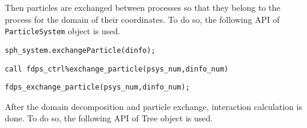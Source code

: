 Then particles are exchanged between processes so that they belong to the process for the domain of their coordinates. To do so, the following API  of \texttt{ParticleSystem} object is used.

\ifCpp %
\begin{lstlisting}[caption=Particle Exchange]
sph_system.exchangeParticle(dinfo);
\end{lstlisting}
\endifCpp
\ifFtn %
\begin{lstlisting}[caption=Particle Exchange]
call fdps_ctrl%exchange_particle(psys_num,dinfo_num)
\end{lstlisting}
\endifFtn
\ifC %
\begin{lstlisting}[caption=Particle Exchange]
fdps_exchange_particle(psys_num,dinfo_num);
\end{lstlisting}
\endifC

After the domain decomposition and particle exchange, interaction calculation is done. To do so, the following API  of \textsf{Tree} object is used. 

